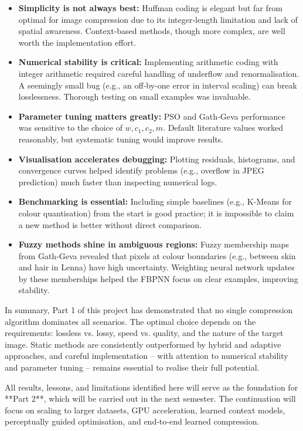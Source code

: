 \begin{itemize}
    \item \textbf{Simplicity is not always best:} Huffman coding is elegant but far from optimal for image compression due to its integer‑length limitation and lack of spatial awareness. Context‑based methods, though more complex, are well worth the implementation effort.
    \item \textbf{Numerical stability is critical:} Implementing arithmetic coding with integer arithmetic required careful handling of underflow and renormalisation. A seemingly small bug (e.g., an off‑by‑one error in interval scaling) can break losslessness. Thorough testing on small examples was invaluable.
    \item \textbf{Parameter tuning matters greatly:} PSO and Gath‑Geva performance was sensitive to the choice of \(w, c_1, c_2, m\). Default literature values worked reasonably, but systematic tuning would improve results.
    \item \textbf{Visualisation accelerates debugging:} Plotting residuals, histograms, and convergence curves helped identify problems (e.g., overflow in JPEG prediction) much faster than inspecting numerical logs.
    \item \textbf{Benchmarking is essential:} Including simple baselines (e.g., K‑Means for colour quantisation) from the start is good practice; it is impossible to claim a new method is better without direct comparison.
    \item \textbf{Fuzzy methods shine in ambiguous regions:} Fuzzy membership maps from Gath‑Geva revealed that pixels at colour boundaries (e.g., between skin and hair in Lenna) have high uncertainty. Weighting neural network updates by these memberships helped the FBPNN focus on clear examples, improving stability.
\end{itemize}

In summary, Part 1 of this project has demonstrated that no single compression algorithm dominates all scenarios. The optimal choice depends on the requirements: lossless vs. lossy, speed vs. quality, and the nature of the target image. Static methods are consistently outperformed by hybrid and adaptive approaches, and careful implementation – with attention to numerical stability and parameter tuning – remains essential to realise their full potential.

All results, lessons, and limitations identified here will serve as the foundation for **Part 2**, which will be carried out in the next semester. The continuation will focus on scaling to larger datasets, GPU acceleration, learned context models, perceptually guided optimisation, and end‑to‑end learned compression.